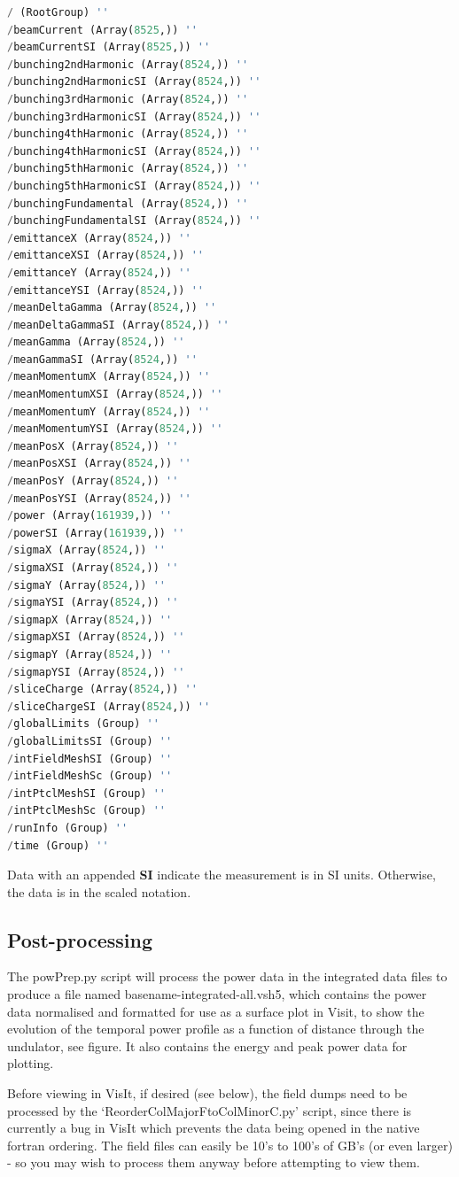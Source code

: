 \documentclass[12pt]{article}%
\begin{document}
\begin{lstlisting}[language=python]
/ (RootGroup) ''
/beamCurrent (Array(8525,)) ''
/beamCurrentSI (Array(8525,)) ''
/bunching2ndHarmonic (Array(8524,)) ''
/bunching2ndHarmonicSI (Array(8524,)) ''
/bunching3rdHarmonic (Array(8524,)) ''
/bunching3rdHarmonicSI (Array(8524,)) ''
/bunching4thHarmonic (Array(8524,)) ''
/bunching4thHarmonicSI (Array(8524,)) ''
/bunching5thHarmonic (Array(8524,)) ''
/bunching5thHarmonicSI (Array(8524,)) ''
/bunchingFundamental (Array(8524,)) ''
/bunchingFundamentalSI (Array(8524,)) ''
/emittanceX (Array(8524,)) ''
/emittanceXSI (Array(8524,)) ''
/emittanceY (Array(8524,)) ''
/emittanceYSI (Array(8524,)) ''
/meanDeltaGamma (Array(8524,)) ''
/meanDeltaGammaSI (Array(8524,)) ''
/meanGamma (Array(8524,)) ''
/meanGammaSI (Array(8524,)) ''
/meanMomentumX (Array(8524,)) ''
/meanMomentumXSI (Array(8524,)) ''
/meanMomentumY (Array(8524,)) ''
/meanMomentumYSI (Array(8524,)) ''
/meanPosX (Array(8524,)) ''
/meanPosXSI (Array(8524,)) ''
/meanPosY (Array(8524,)) ''
/meanPosYSI (Array(8524,)) ''
/power (Array(161939,)) ''
/powerSI (Array(161939,)) ''
/sigmaX (Array(8524,)) ''
/sigmaXSI (Array(8524,)) ''
/sigmaY (Array(8524,)) ''
/sigmaYSI (Array(8524,)) ''
/sigmapX (Array(8524,)) ''
/sigmapXSI (Array(8524,)) ''
/sigmapY (Array(8524,)) ''
/sigmapYSI (Array(8524,)) ''
/sliceCharge (Array(8524,)) ''
/sliceChargeSI (Array(8524,)) ''
/globalLimits (Group) ''
/globalLimitsSI (Group) ''
/intFieldMeshSI (Group) ''
/intFieldMeshSc (Group) ''
/intPtclMeshSI (Group) ''
/intPtclMeshSc (Group) ''
/runInfo (Group) ''
/time (Group) ''
\end{lstlisting}

Data with an appended {\bf SI} indicate the measurement is in SI units. Otherwise, the data is in the scaled notation.

\subsection{Post-processing}

The powPrep.py script will process the power data in the integrated data files to produce a file named basename-integrated-all.vsh5, which contains the power data normalised and formatted for use as a surface plot in Visit, to show the evolution of the temporal power profile as a function of distance through the undulator, see figure. It also contains the energy and peak power data for plotting.

Before viewing in VisIt, if desired (see below), the field dumps need to be processed by the `ReorderColMajorFtoColMinorC.py' script, since there is currently a bug in VisIt which prevents the data being opened in the native fortran ordering. The field files can easily be 10's to 100's of GB's (or even larger) - so you may wish to process them anyway before attempting to view them. 
\end{document}
